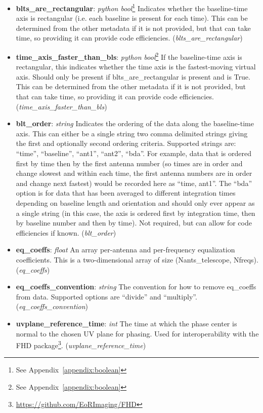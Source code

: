 \documentclass[11pt, oneside]{article}
\begin{document}
\begin{itemize}
\item \textbf{blts\_are\_rectangular}: \textit{python bool}\footnote{See Appendix~\ref{appendix:boolean}}
    Indicates whether the baseline-time axis is rectangular (i.e. each baseline is
    present for each time). This can be determined from the other metadata if
    it is not provided, but that can take time, so providing it can provide code efficiencies. 
   (\textit{blts\_are\_rectangular})
\item \textbf{time\_axis\_faster\_than\_bls}: \textit{python bool}\footnote{See Appendix~\ref{appendix:boolean}}
    If the baseline-time axis is rectangular, this indicates whether the time axis is
    the fastest-moving virtual axis. Should only be present if blts\_are\_rectangular
    is present and is True. This can be determined from the other metadata if
    it is not provided, but that can take time, so providing it can provide code efficiencies. 
   (\textit{time\_axis\_faster\_than\_bls})
\item \textbf{blt\_order}: \textit{string} Indicates the ordering of the data along
  the baseline-time axis. This can either be a single string two comma delimited
  strings giving the first and optionally second ordering criteria. Supported strings
  are: ``time'', ``baseline'', ``ant1'', ``ant2'', ``bda''. For example, data that is
  ordered first by time then by the first antenna number (so times are in order and
  change slowest and within each time, the first antenna numbers are in order
  and change next fastest) would be recorded here as ``time, ant1''. The ``bda''
  option is for data that has been averaged to different integration times
  depending on baseline length and orientation and should only ever appear as a
  single string (in this case, the axis is ordered first by integration time, then by
  baseline number and then by time).
  Not required, but can allow for code efficiencies if known. 
 (\textit{blt\_order})

\item \textbf{eq\_coeffs}: \textit{float} An array per-antenna and per-frequency
  equalization coefficients. This is a two-dimensional array of size
  (Nants\_telescope, Nfreqs). (\textit{eq\_coeffs})
\item \textbf{eq\_coeffs\_convention}: \textit{string} The convention for how
  to remove eq\_coeffs from data. Supported options are ``divide'' and ``multiply''.
  (\textit{eq\_coeffs\_convention})

\item \textbf{uvplane\_reference\_time}: \textit{int} The time at which the
  phase center is normal to the chosen UV plane for phasing. Used for
  interoperability with the FHD
  package\footnote{\url{https://github.com/EoRImaging/FHD}}. (\textit{uvplane\_reference\_time})
\end{itemize}
\end{document}
